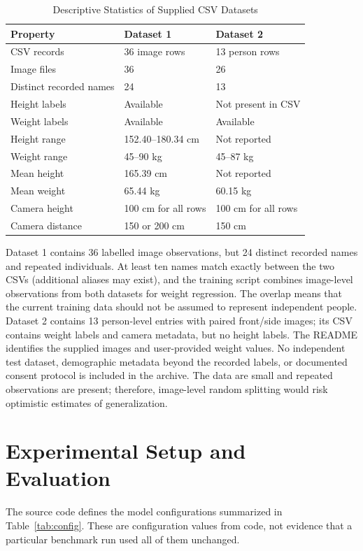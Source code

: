 \documentclass[conference]{IEEEtran}
\begin{document}
\begin{table}[t]
\caption{Descriptive Statistics of Supplied CSV Datasets}
\label{tab:dataset}
\centering
\footnotesize
\begin{tabular}{@{}p{}p{}p{}@{}}
\toprule
\textbf{Property} & \textbf{Dataset 1} & \textbf{Dataset 2}\\
\midrule
CSV records & 36 image rows & 13 person rows\\
Image files & 36 & 26\\
Distinct recorded names & 24 & 13\\
Height labels & Available & Not present in CSV\\
Weight labels & Available & Available\\
Height range & 152.40--180.34 cm & Not reported\\
Weight range & 45--90 kg & 45--87 kg\\
Mean height & 165.39 cm & Not reported\\
Mean weight & 65.44 kg & 60.15 kg\\
Camera height & 100 cm for all rows & 100 cm for all rows\\
Camera distance & 150 or 200 cm & 150 cm\\
\bottomrule
\end{tabular}
\end{table}

Dataset 1 contains 36 labelled image observations, but 24 distinct recorded names and repeated individuals. At least ten names match exactly between the two CSVs (additional aliases may exist), and the training script combines image-level observations from both datasets for weight regression. The overlap means that the current training data should not be assumed to represent independent people. Dataset 2 contains 13 person-level entries with paired front/side images; its CSV contains weight labels and camera metadata, but no height labels. The README identifies the supplied images and user-provided weight values. No independent test dataset, demographic metadata beyond the recorded labels, or documented consent protocol is included in the archive. The data are small and repeated observations are present; therefore, image-level random splitting would risk optimistic estimates of generalization.

\section{Experimental Setup and Evaluation}
The source code defines the model configurations summarized in Table~\ref{tab:config}. These are configuration values from code, not evidence that a particular benchmark run used all of them unchanged.
\end{document}
